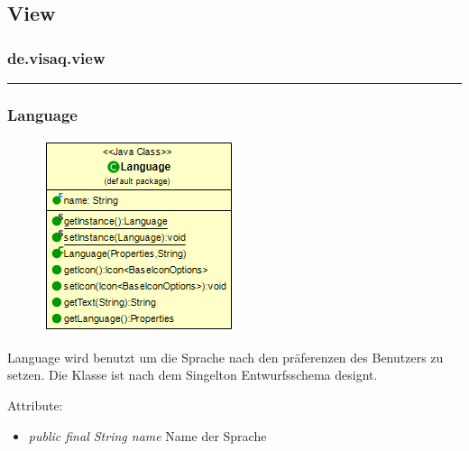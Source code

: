 \subsection{View}



\subsubsection{de.visaq.view}
\rule{\textwidth}{0.4pt}
\subsubsection {Language}
\begin{minipage}{0.3\textwidth}
    \begin{figure}[H]
        {\centering\includegraphics[scale = 0.5
        ]{media/view/view/Language_Class.png}}
    \end{figure}
    \end{minipage} \hfill
    \begin{minipage}{0.6\textwidth}
    Language wird benutzt um die Sprache nach den präferenzen des Benutzers zu setzen. Die Klasse ist nach dem Singelton Entwurfsschema designt.
    \end{minipage}
    \vspace{\baselineskip}
    Attribute: \begin{itemize} [noitemsep]
    \item \emph{public final String name} Name der Sprache
    \end{itemize}
